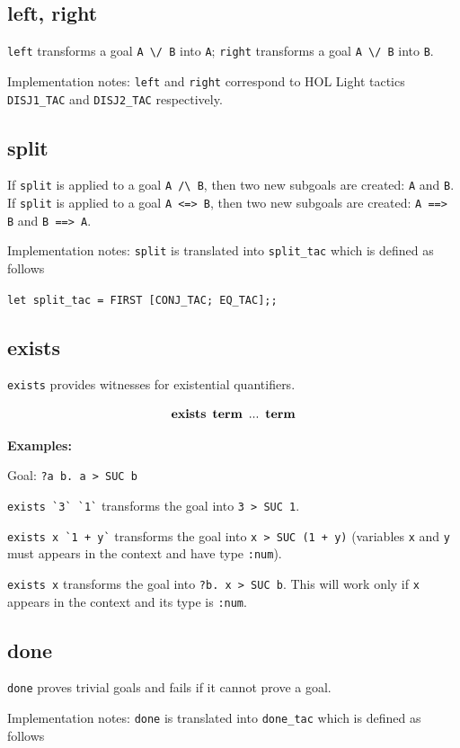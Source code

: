 \documentclass[a4paper]{article}
\newcommand{\xx}[1]{\mathop{\text{\bf #1}}}
\begin{document}
\subsection{left, right}
\verb|left| transforms a goal \verb|A \/ B| into \verb|A|; \verb|right| transforms a goal \verb|A \/ B| into \verb|B|.

Implementation notes: \verb|left| and \verb|right| correspond to HOL Light tactics \verb|DISJ1_TAC| and \verb|DISJ2_TAC| respectively.

\subsection{split}
If \verb|split| is applied to a goal \verb|A /\ B|, then two new subgoals are created: \verb|A| and \verb|B|. If \verb|split| is applied to a goal \verb|A <=> B|, then two new subgoals are created: \verb|A ==> B| and \verb|B ==> A|.

Implementation notes: \verb|split| is translated into \verb|split_tac| which is defined as follows

\verb|let split_tac = FIRST [CONJ_TAC; EQ_TAC];;|


\subsection{exists}
\verb|exists| provides witnesses for existential quantifiers.

$$\xx{exists}\ \xx{term}\ ...\ \xx{term}$$

{\bf Examples:}

Goal: \verb|?a b. a > SUC b|

\verb|exists `3` `1`| transforms the goal into \verb|3 > SUC 1|.

\verb|exists x `1 + y`| transforms the goal into \verb|x > SUC (1 + y)| (variables \verb|x| and \verb|y| must appears in the context and have type \verb|:num|).

\verb|exists x| transforms the goal into \verb|?b. x > SUC b|. This will work only if \verb|x| appears in the context and its type is \verb|:num|.


\subsection{done}
\verb|done| proves trivial goals and fails if it cannot prove a goal.

Implementation notes: \verb|done| is translated into \verb|done_tac| which is defined as follows
\end{document}

